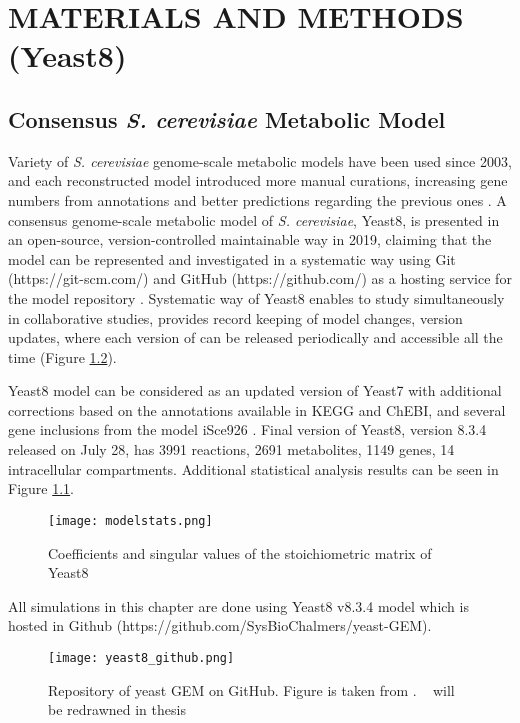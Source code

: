 \chapter{MATERIALS AND METHODS (Yeast8)}

\section{Consensus \emph{S. cerevisiae} Metabolic Model}
Variety of \emph{S. cerevisiae} genome-scale metabolic models have been used since 2003, and each reconstructed model introduced more manual curations, increasing gene numbers from annotations and better predictions regarding the previous ones \cite{lopes2017genome}. A consensus genome-scale metabolic model of \emph{S. cerevisiae}, Yeast8, is presented in an open-source, version-controlled maintainable way in 2019, claiming that the model can be represented and investigated in a systematic way using Git (https://git-scm.com/) and GitHub (https://github.com/) as a hosting service for the model repository \cite{lu2019consensus}. Systematic way of Yeast8 enables to study simultaneously in collaborative studies, provides record keeping of model changes, version updates, where each version of can be released periodically and accessible all the time (Figure \ref{fig:yeast8_github}).

Yeast8 model can be considered as an updated version of Yeast7 \cite{aung2013revising} with additional corrections based on the annotations available in KEGG and ChEBI, and several gene inclusions from the model iSce926 \cite{chowdhury2015using}. Final version of Yeast8, version 8.3.4 released on July 28, has 3991 reactions, 2691 metabolites, 1149 genes, 14 intracellular compartments. Additional statistical analysis results can be seen in Figure \ref{fig:modelstats}.

\begin{figure}[H]
\begin{center}
\texttt{[image: modelstats.png]}
\end{center}
\caption[Coefficients and singular values of the stoichiometric matrix of Yeast8]{Coefficients and singular values of the stoichiometric matrix of Yeast8}
\label{fig:modelstats}
\end{figure}

All simulations in this chapter are done using Yeast8 v8.3.4 model which is hosted in Github (https://github.com/SysBioChalmers/yeast-GEM).

\begin{figure}[H]
\begin{center}
\texttt{[image: yeast8\_github.png]}
\end{center}
\caption[Repository of yeast GEM on GitHub]{Repository of yeast GEM on GitHub. Figure is taken from \cite{lu2019consensus}. ~ will be redrawned in thesis}
\label{fig:yeast8_github}
\end{figure}


